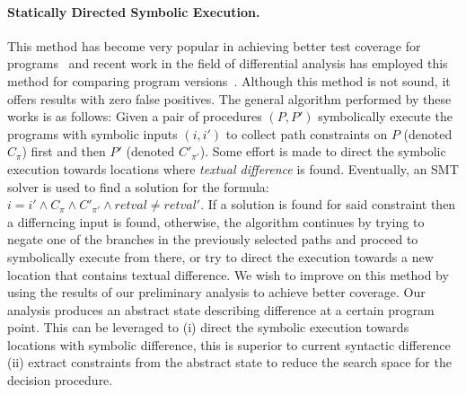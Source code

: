\paragraph{Statically Directed Symbolic Execution.} This method has become very popular in achieving better test coverage for programs~\cite{GodefroidKlarlundSen05} and recent work in the field of differential analysis has employed this method for comparing program versions~\cite{DwyerElbaumPerson08}. Although this method is not sound, it offers results with zero false positives. The general algorithm performed by these works is as follows: Given a pair of procedures $(P,P')$ symbolically execute the programs with symbolic inputs $(i,i')$ to collect path constraints on $P$ (denoted $C_{\pi}$) first and then $P'$ (denoted $C'_{\pi'}$). Some effort is made to direct the symbolic execution towards locations where \emph{textual difference} is found. Eventually, an SMT solver is used to find a solution for the formula: $i = i' \wedge C_{\pi} \wedge C'_{\pi'} \wedge retval \neq retval'$. If a solution is found for said constraint then a differncing input is found, otherwise, the algorithm continues by trying to negate one of the branches in the previously selected paths and proceed to symbolically execute from there, or try to direct the execution towards a new location that contains textual difference. We wish to improve on this method by using the results of our preliminary analysis to achieve better coverage. Our analysis produces an abstract state describing difference at a certain program point. This can be leveraged to (i) direct the symbolic execution towards locations with symbolic difference, this is superior to current syntactic difference (ii) extract constraints from the abstract state to reduce the search space for the decision procedure. 

